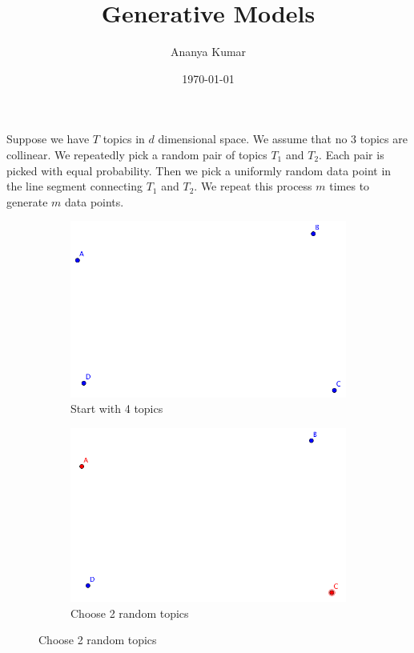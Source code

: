 \documentclass[12pt]{article}
\theoremstyle{definition}
\begin{document}
\title{Generative Models}         %
\author{Ananya Kumar}        %
\date{\today}          %
\maketitle

Suppose we have $T$ topics in $d$ dimensional space. We assume that no 3 topics are collinear. We repeatedly pick a random pair of topics $T_1$ and $T_2$. Each pair is picked with equal probability. Then we pick a uniformly random data point in the line segment connecting $T_1$ and $T_2$. We repeat this process $m$ times to generate $m$ data points.

\begin{figure}[!htb]
\centering
\begin{subfigure}[b]{.35\linewidth}
\includegraphics[width=\linewidth]{4_topics}
\caption{Start with 4 topics}\label{fig:mouse}
\end{subfigure}\hspace{20 mm}
\begin{subfigure}[b]{.35\linewidth}
\includegraphics[width=\linewidth]{select_2_topics}
\caption{Choose 2 random topics}\label{fig:gull}
\end{subfigure}


\end{figure}
\end{document}

